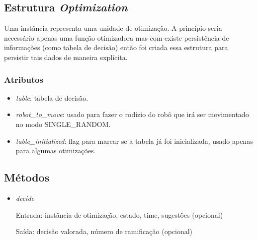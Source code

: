 %
%
%

%
%
%
%

\subsection*{Estrutura \textit{Optimization}}

Uma instância representa uma unidade de otimização.  A princípio seria
necessário apenas uma função otimizadora mas com existe persistência de
informações (como tabela de decisão) então foi criada essa estrutura para
persistir tais dados de maneira explícita.

\subsubsection*{Atributos}

\begin{itemize}
  \item \textit{table}: tabela de decisão.
  \item \textit{robot_to_move}: usado para fazer o rodízio do robô que irá ser
    movimentado no modo SINGLE_RANDOM.
  \item \textit{table_initialized}: flag para marcar se a tabela já foi
    inicializada, usado apenas para algumas otimizações.
\end{itemize}

\subsection*{Métodos}

\begin{itemize}
  \item \textit{decide}
    \par Entrada: instância de otimização, estado, time, sugestões (opcional)
    \par Saída: decisão valorada, número de ramificação (opcional)
\end{itemize}

